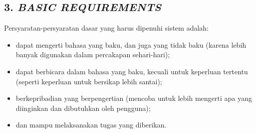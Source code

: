 \subsection*{\textcolor{subsectioncolor}{\textsf{3. \textit{BASIC REQUIREMENTS}}}}

Persyaratan-persyaratan dasar yang harus dipenuhi sistem adalah:
\begin{itemize}
\item dapat mengerti bahasa yang baku, dan juga yang tidak baku (karena lebih banyak digunakan dalam percakapan sehari-hari);
\item dapat berbicara dalam bahasa yang baku, kecuali untuk keperluan tertentu (seperti keperluan untuk bersikap lebih santai);
\item berkepribadian yang berpengertian (mencoba untuk lebih mengerti apa yang diinginkan dan dibutuhkan oleh pengguna);
\item dan mampu melaksanakan tugas yang diberikan.
\end{itemize}

